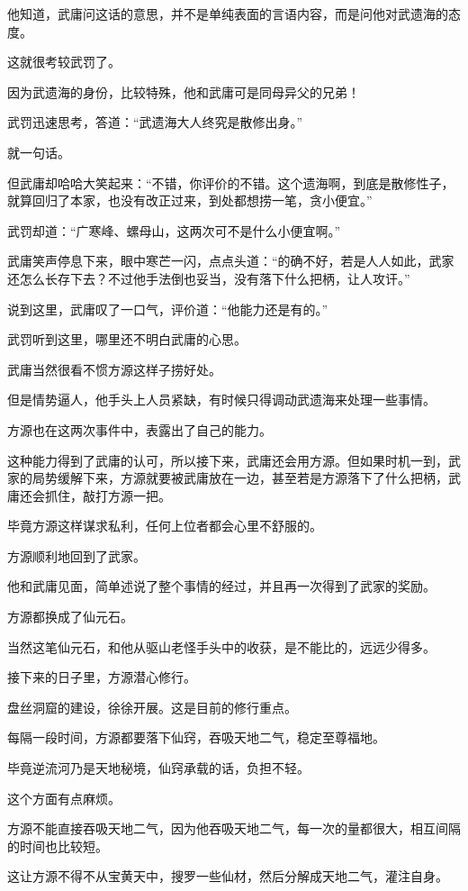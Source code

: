 \begin{this_body}
他知道，武庸问这话的意思，并不是单纯表面的言语内容，而是问他对武遗海的态度。

这就很考较武罚了。

因为武遗海的身份，比较特殊，他和武庸可是同母异父的兄弟！

武罚迅速思考，答道：“武遗海大人终究是散修出身。”

就一句话。

但武庸却哈哈大笑起来：“不错，你评价的不错。这个遗海啊，到底是散修性子，就算回归了本家，也没有改正过来，到处都想捞一笔，贪小便宜。”

武罚却道：“广寒峰、螺母山，这两次可不是什么小便宜啊。”

武庸笑声停息下来，眼中寒芒一闪，点点头道：“的确不好，若是人人如此，武家还怎么长存下去？不过他手法倒也妥当，没有落下什么把柄，让人攻讦。”

说到这里，武庸叹了一口气，评价道：“他能力还是有的。”

武罚听到这里，哪里还不明白武庸的心思。

武庸当然很看不惯方源这样子捞好处。

但是情势逼人，他手头上人员紧缺，有时候只得调动武遗海来处理一些事情。

方源也在这两次事件中，表露出了自己的能力。

这种能力得到了武庸的认可，所以接下来，武庸还会用方源。但如果时机一到，武家的局势缓解下来，方源就要被武庸放在一边，甚至若是方源落下了什么把柄，武庸还会抓住，敲打方源一把。

毕竟方源这样谋求私利，任何上位者都会心里不舒服的。

方源顺利地回到了武家。

他和武庸见面，简单述说了整个事情的经过，并且再一次得到了武家的奖励。

方源都换成了仙元石。

当然这笔仙元石，和他从驱山老怪手头中的收获，是不能比的，远远少得多。

接下来的日子里，方源潜心修行。

盘丝洞窟的建设，徐徐开展。这是目前的修行重点。

每隔一段时间，方源都要落下仙窍，吞吸天地二气，稳定至尊福地。

毕竟逆流河乃是天地秘境，仙窍承载的话，负担不轻。

这个方面有点麻烦。

方源不能直接吞吸天地二气，因为他吞吸天地二气，每一次的量都很大，相互间隔的时间也比较短。

这让方源不得不从宝黄天中，搜罗一些仙材，然后分解成天地二气，灌注自身。


\end{this_body}
